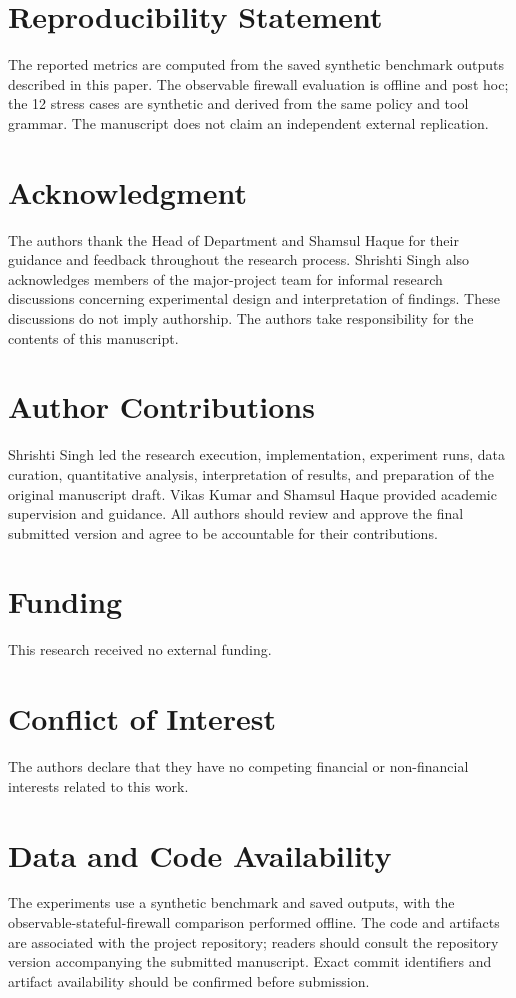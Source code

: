 \documentclass[conference]{IEEEtran}
\begin{document}
\section*{Reproducibility Statement}
The reported metrics are computed from the saved synthetic benchmark outputs described in this paper. The observable firewall evaluation is offline and post hoc; the 12 stress cases are synthetic and derived from the same policy and tool grammar. The manuscript does not claim an independent external replication.

\section*{Acknowledgment}
The authors thank the Head of Department and Shamsul Haque for their guidance and feedback throughout the research process. Shrishti Singh also acknowledges members of the major-project team for informal research discussions concerning experimental design and interpretation of findings. These discussions do not imply authorship. The authors take responsibility for the contents of this manuscript.

\section*{Author Contributions}
Shrishti Singh led the research execution, implementation, experiment runs, data curation, quantitative analysis, interpretation of results, and preparation of the original manuscript draft. Vikas Kumar and Shamsul Haque provided academic supervision and guidance. All authors should review and approve the final submitted version and agree to be accountable for their contributions.

\section*{Funding}
This research received no external funding.

\section*{Conflict of Interest}
The authors declare that they have no competing financial or non-financial interests related to this work.

\section*{Data and Code Availability}
The experiments use a synthetic benchmark and saved outputs, with the observable-stateful-firewall comparison performed offline. The code and artifacts are associated with the project repository; readers should consult the repository version accompanying the submitted manuscript. Exact commit identifiers and artifact availability should be confirmed before submission.
\end{document}
